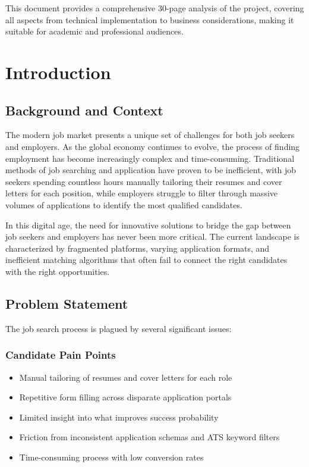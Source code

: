 \documentclass[12pt,a4paper]{report}
\begin{document}
This document provides a comprehensive 30-page analysis of the project, covering all aspects from technical implementation to business considerations, making it suitable for academic and professional audiences.

\newpage
\tableofcontents
\newpage
\listoffigures
\newpage
\listoftables
\newpage

\chapter{Introduction}

\section{Background and Context}
The modern job market presents a unique set of challenges for both job seekers and employers. As the global economy continues to evolve, the process of finding employment has become increasingly complex and time-consuming. Traditional methods of job searching and application have proven to be inefficient, with job seekers spending countless hours manually tailoring their resumes and cover letters for each position, while employers struggle to filter through massive volumes of applications to identify the most qualified candidates.

In this digital age, the need for innovative solutions to bridge the gap between job seekers and employers has never been more critical. The current landscape is characterized by fragmented platforms, varying application formats, and inefficient matching algorithms that often fail to connect the right candidates with the right opportunities.

\section{Problem Statement}
The job search process is plagued by several significant issues:

\subsection{Candidate Pain Points}
\begin{itemize}[leftmargin=2em]
  \item Manual tailoring of resumes and cover letters for each role
  \item Repetitive form filling across disparate application portals
  \item Limited insight into what improves success probability
  \item Friction from inconsistent application schemas and ATS keyword filters
  \item Time-consuming process with low conversion rates
\end{itemize}
\end{document}
